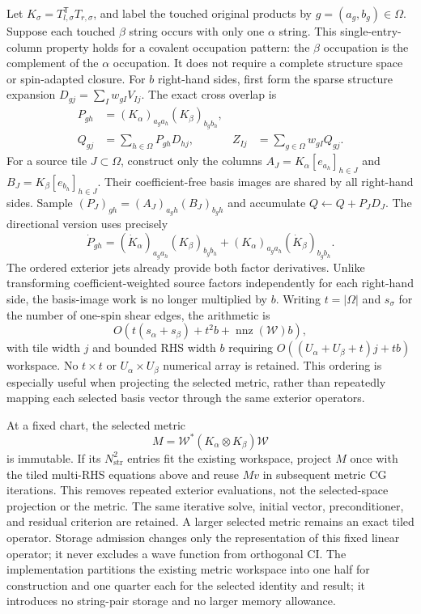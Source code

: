 \documentclass[11pt,a4paper]{article}
\newcommand{\Tr}{^{\mathsf T}}
\newcommand{\Wa}{\mathcal W}
\begin{document}
Let $K_\sigma=T_{l,\sigma}\Tr T_{r,\sigma}$, and label the
touched original products by $g=(a_g,b_g)\in\Omega$. Suppose each
touched $\beta$ string occurs with only one $\alpha$ string. This
single-entry-column property holds for a covalent occupation pattern: the
$\beta$ occupation is the complement of the $\alpha$ occupation.
It does not require a complete structure space or spin-adapted closure.
For $b$ right-hand sides, first form the sparse structure expansion
$D_{gj}=\sum_I w_{gI}V_{Ij}$. The exact cross overlap is
\begin{align}
 P_{gh}&=(K_\alpha)_{a_g a_h}(K_\beta)_{b_g b_h},\\
 Q_{gj}&=\sum_{h\in\Omega}P_{gh}D_{hj},
 &Z_{Ij}&=\sum_{g\in\Omega}w_{gI}Q_{gj}.
\end{align}
For a source tile $J\subset\Omega$, construct only the columns
$A_J=K_\alpha[e_{a_h}]_{h\in J}$ and
$B_J=K_\beta[e_{b_h}]_{h\in J}$. Their coefficient-free basis images
are shared by all right-hand sides. Sample
$(P_J)_{gh}=(A_J)_{a_g h}(B_J)_{b_g h}$ and accumulate
$Q\gets Q+P_JD_J$. The directional version uses precisely
\begin{equation}
 \dot P_{gh}=(\dot K_\alpha)_{a_g a_h}(K_\beta)_{b_g b_h}
 +(K_\alpha)_{a_g a_h}(\dot K_\beta)_{b_g b_h}.
\end{equation}
The ordered exterior jets already provide both factor derivatives.
Unlike transforming coefficient-weighted source factors independently for
each right-hand side, the basis-image work is no longer multiplied by $b$.
Writing $t=|\Omega|$ and $s_\sigma$ for the number of one-spin shear
edges, the arithmetic is
\begin{equation}
 O\!\left(t(s_\alpha+s_\beta)+t^2b+
 \operatorname{nnz}(\Wa)b\right),
\end{equation}
with tile width $j$ and bounded RHS width $b$ requiring
$O((U_\alpha+U_\beta+t)j+tb)$ workspace. No $t\times t$ or
$U_\alpha\times U_\beta$ numerical array is retained. This ordering
is especially useful when projecting the selected metric, rather than
repeatedly mapping each selected basis vector through the same exterior
operators.

At a fixed chart, the selected metric
\begin{equation}
 M=\Wa^*(K_\alpha\otimes K_\beta)\Wa
\end{equation}
is immutable. If its $N_{\mathrm{str}}^2$ entries fit the existing
workspace, project $M$ once with the tiled multi-RHS equations above and
reuse $Mv$ in subsequent metric CG iterations. This removes repeated
exterior evaluations, not the selected-space projection or the metric.
The same iterative solve, initial vector, preconditioner, and residual
criterion are retained. A larger selected metric remains an exact tiled
operator. Storage admission changes only the representation of this fixed
linear operator; it never excludes a wave function from orthogonal CI.
The implementation partitions the existing metric workspace into one half
for construction and one quarter each for the selected identity and result;
it introduces no string-pair storage and no larger memory allowance.
\end{document}
